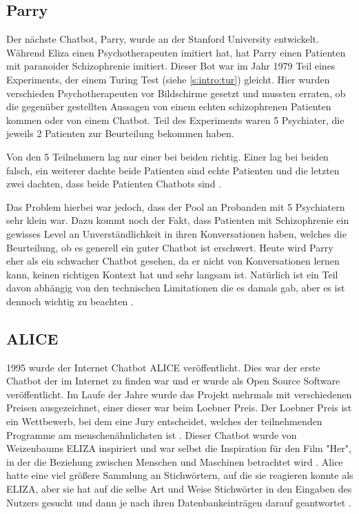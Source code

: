 \subsection{Parry}
Der nächste Chatbot, Parry, wurde an der Stanford University entwickelt. Während Eliza 
 einen Psychotherapeuten imitiert hat, hat Parry
einen Patienten mit paranoider Schizophrenie imitiert. Dieser Bot war im Jahr 1979 Teil eines 
Experiments, der einem Turing Test (siehe \ref*{s:intro:tur}) gleicht. Hier wurden verschieden
Psychotherapeuten vor Bildschirme gesetzt und mussten erraten, ob die gegenüber gestellten Aussagen 
von einem echten schizophrenen Patienten kommen oder von einem
Chatbot. Teil des Experiments waren 5 Psychiater, die jeweils 2 Patienten zur Beurteilung bekommen 
haben. 

Von den 5 Teilnehmern lag nur einer bei beiden richtig. Einer lag bei beiden falsch, ein weiterer dachte 
beide Patienten sind echte Patienten und die letzten zwei dachten, dass beide Patienten Chatbots sind \cite{adamopoulouChatbotsHistoryTechnology2020}.

Das Problem hierbei war jedoch, dass der Pool an
Probanden mit 5 Psychiatern sehr klein war. Dazu kommt noch der Fakt, dass Patienten mit Schizophrenie 
ein gewisses Level an Unverständlichkeit in ihren Konversationen
haben, welches die Beurteilung, ob es generell ein guter Chatbot ist erschwert. Heute wird Parry eher als 
ein schwacher Chatbot gesehen, da er nicht von Konversationen
lernen kann, keinen richtigen Kontext hat und sehr langsam ist. Natürlich ist ein Teil davon abhängig 
von den technischen Limitationen die es damals gab, aber es ist
dennoch wichtig zu beachten \cite{adamopoulouChatbotsHistoryTechnology2020}. 
\subsection{ALICE}
1995 wurde der Internet Chatbot ALICE veröffentlicht. Dies war der erste Chatbot der im Internet zu finden war 
und er wurde als Open Source Software veröffentlicht. Im Laufe der Jahre wurde das Projekt mehrmals mit verschiedenen 
Preisen ausgezeichnet, einer dieser war beim Loebner Preis. Der Loebner Preis ist ein Wettbewerb,
bei dem eine Jury entscheidet, welches der teilnehmenden Programme am menschenähnlichsten ist \cite{LoebnerPrize}. Dieser
Chatbot wurde von Weizenbaums ELIZA inspiriert und war selbst die Inspiration für den Film "Her", in der 
die Beziehung zwischen Menschen und Maschinen betrachtet 
wird \cite{moraisCanHumansFall2013}. Alice hatte eine viel größere Sammlung an Stichwörtern, auf die sie 
reagieren konnte als ELIZA,
aber sie hat auf die selbe Art und Weise Stichwörter in den Eingaben des Nutzers gesucht und dann je nach 
ihren Datenbankeinträgen darauf geantwortet \cite{adamopoulouChatbotsHistoryTechnology2020, Wallace2009}.



